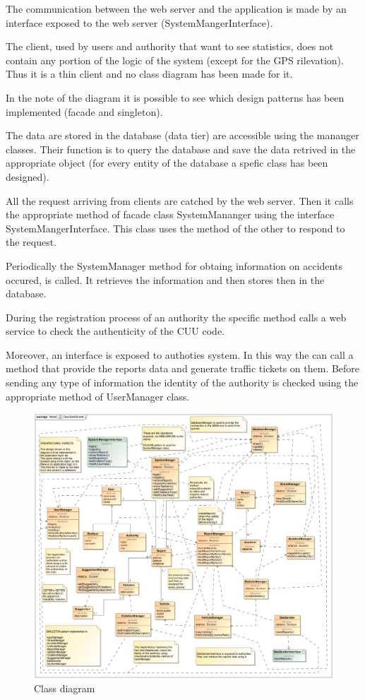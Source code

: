  The communication between the web server and the application is made by an interface exposed to the web server (SystemMangerInterface).
 
The client, used by users and authority that want to see statistics, does not contain any portion of the logic of the system (except for the GPS rilevation). Thus it is a thin client and no class diagram has been made for it.

In the note of the diagram it is possible to see which design patterns has been implemented (facade and singleton).

The data are stored in the database (data tier) are accessible using the mananger classes. Their function is to query the database and save the data retrived in the appropriate object (for every entity of the database a spefic class has been designed).

All the request arriving from clients are catched by the web server. Then it calls the appropriate method of facade class SystemMananger using the interface SystemMangerInterface. This class uses the method of the other to respond to the request.

Periodically the SystemManager method for obtaing information on accidents occured, is called. It retrieves the information and then stores then in the database.

During the registration process of an authority the specific method calls a web service to check the authenticity of the CUU code.

Moreover, an interface is exposed to authoties system. In this way the can call a method that provide the reports data and generate traffic tickets on them. Before sending any type of information the identity of the authority is checked using the appropriate method of UserManager class.

\begin{figure}[H]
	\centering
	\includegraphics[width=1.12\linewidth]{Images/ClassSafeStreets.png}
	\caption{Class diagram}
\end{figure}

